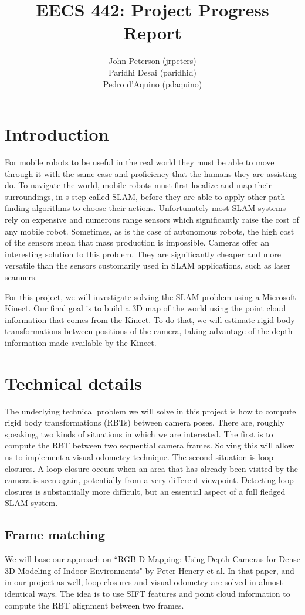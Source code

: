 \documentclass[12pt]{article}
\title{EECS 442: Project Progress Report}
\author{
	John Peterson (jrpeters)\\
	Paridhi Desai (paridhid)\\
	Pedro d'Aquino (pdaquino)}
\begin{document}
\maketitle

\section{Introduction}
For mobile robots to be useful in the real world they must be able to move through it 
with the same ease and proficiency that the humans they are assisting do.  To navigate the world, 
mobile robots must first localize and map their surroundings, in s step called SLAM, before they are 
able to apply other path finding algorithms to choose their actions.   Unfortunately most SLAM systems rely 
on expensive and numerous range sensors which significantly raise the cost of any mobile robot. Sometimes, as is the
case of autonomous robots, the high cost of the sensors mean that mass production is impossible. Cameras
offer an interesting solution to this problem.  They are significantly cheaper and more versatile than the 
sensors customarily used in SLAM applications, such as laser scanners.

For this project, we will investigate solving the SLAM problem using a Microsoft Kinect. Our final goal is
to build a 3D map of the world using the point cloud information that comes from the Kinect. To do that, we
will estimate rigid body transformations between positions of the camera, taking advantage of the depth information
made available by the Kinect.

\section{Technical details}
The underlying technical problem we will solve in this project is how to compute rigid body transformations (RBTs) between camera poses. There are, roughly speaking, two kinds of situations in which we are interested. The first is to compute the RBT between two sequential camera frames. Solving this will allow us to implement a visual odometry technique. The second situation is loop closures. A loop closure occurs when an area that has already been visited by the camera is seen again, potentially from a very different viewpoint. Detecting loop closures is substantially more difficult, but an essential aspect of a full fledged SLAM system.

\subsection{Frame matching}
We will base our approach on ``RGB-D Mapping: Using Depth Cameras for Dense 3D Modeling of Indoor Environments" by Peter Henery et al. In that paper, and in our project as well, loop closures and visual odometry are solved in almost identical ways. The idea is to use SIFT features and point cloud information to compute the RBT alignment between two frames.
\end{document}
